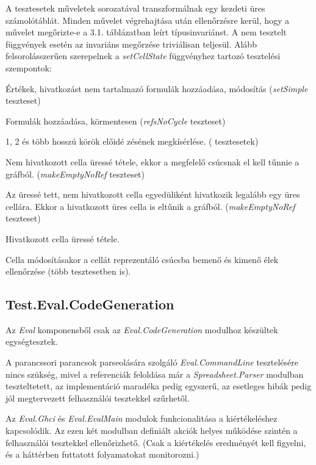 A tesztesetek műveletek sorozatával transzformálnak egy kezdeti üres számolótáblát. Minden művelet végrehajtása után ellenőrzésre kerül, hogy a művelet megőrizte-e a 3.1. táblázatban leírt típusinvariánst. A nem tesztelt függvények esetén az invariáns megőrzése triviálisan teljesül.
Alább felsorolásszerűen szerepelnek a \textit{setCellState} függvényhez tartozó tesztelési szempontok:

\begin{compactenum}
	\item Értékek, hivatkozást nem tartalmazó formulák hozzáadása, módosítás (\textit{setSimple} teszteset)
	\item Formulák hozzáadása, körmentesen (\textit{refsNoCycle} teszteset)
	\item 1, 2 és több hosszú körök előidé	zésének megkísérlése. ( tesztesetek)
	\item Nem hivatkozott cella üressé tétele, ekkor a megfelelő csúcsnak el kell tűnnie a gráfból. (\textit{makeEmptyNoRef} teszteset)
	\item Az üressé tett, nem hivatkozott cella egyedüliként hivatkozik legalább egy üres cellára. Ekkor a hivatkozott üres cella is eltűnik a gráfból. (\textit{makeEmptyNoRef} teszteset)
	\item Hivatkozott cella üressé tétele.
	\item Cella módosításakor a cellát reprezentáló csúcsba bemenő és kimenő élek ellenőrzése (több tesztesetben is).
\end{compactenum}

\subsection{Test.Eval.CodeGeneration}

Az \textit{Eval} komponensből csak az \textit{Eval.CodeGeneration} modulhoz készültek egységtesztek. 

A parancssori parancsok parseolására szolgáló \textit{Eval.CommandLine} tesztelésére nincs szükség, mivel a referenciák feloldása már a \textit{Spreadsheet.Parser} modulban teszteltetett, az implementáció maradéka pedig egyszerű, az esetleges hibák pedig jól megtervezett felhasználói tesztekkel szűrhetől.

Az \textit{Eval.Ghci} és \textit{Eval.EvalMain} modulok funkcionalitása a kiértékeléshez kapcsolódik. Az ezen két modulban definiált akciók helyes működése szintén a felhasználói tesztekkel ellenőrizhető. (Csak a kiértékelés eredményét kell figyelni, és a háttérben futtatott folyamatokat monitorozni.)

